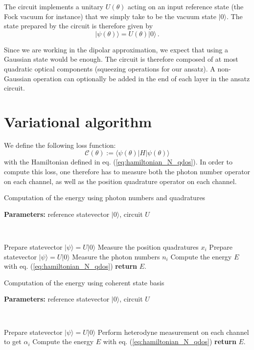 \documentclass[reprint, amsmath, amssymb, aps]{revtex4-2}
\begin{document}
    The circuit implements a unitary $U(\theta)$ acting on an input reference state (the Fock vacuum for instance) that we simply take to be the vacuum state $|0\rangle$. The state prepared by the circuit is therefore given by
    \begin{equation}
        |\psi(\theta)\rangle = U(\theta)|0\rangle\,.
    \end{equation}

    Since we are working in the dipolar approximation, we expect that using a Gaussian state would be enough. The circuit is therefore composed of at most quadratic optical components (squeezing operations for our ansatz). A non-Gaussian operation can optionally be added in the end of each layer in the ansatz circuit.

\section{Variational algorithm}

    We define the following loss function:
    \begin{equation}
        \mathcal C(\theta) := \langle\psi(\theta)|H|\psi(\theta)\rangle
    \end{equation}
    with the Hamiltonian defined in eq. (\ref{eq:hamiltonian_N_qdos}).
    In order to compute this loss, one therefore has to measure both the photon number operator on each channel, as well as the position quadrature operator on each channel.
    \newpage

    \begin{algorithm}
        \caption{Computation of the energy using photon numbers and quadratures}\label{alg:energy_computation}
            \textbf{Parameters:} reference statevector $|0\rangle$, circuit $U$

            \

            Prepare statevector $|\psi\rangle = U|0\rangle$\;
            Measure the position quadratures $x_i$\;
            Prepare statevector $|\psi\rangle = U|0\rangle$\;
            Measure the photon numbers $n_i$\;
            Compute the energy $E$ with eq. (\ref{eq:hamiltonian_N_qdos})\;
            \textbf{return} $E$.
    \end{algorithm}

    \begin{algorithm}
        \caption{Computation of the energy using coherent state basis}\label{alg:energy_computation_coherent_basis}
            \textbf{Parameters:} reference statevector $|0\rangle$, circuit $U$

            \

            Prepare statevector $|\psi\rangle = U|0\rangle$\;
            Perform heterodyne measurement on each channel to get $\alpha_i$\;
            Compute the energy $E$ with eq. (\ref{eq:hamiltonian_N_qdos})\;
            \textbf{return} $E$.
    \end{algorithm}
\end{document}
